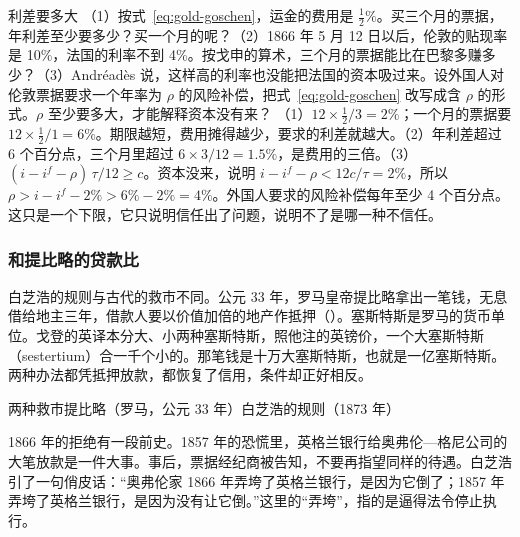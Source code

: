 \begin{example}{利差要多大}\label{ex:gold-goschen}
（1）按式~\eqref{eq:gold-goschen}，运金的费用是 $\tfrac12\%$。买三个月的票据，年利差至少要多少？买一个月的呢？（2）1866 年 5 月 12 日以后，伦敦的贴现率是 10\%，法国的利率不到 4\%\cite{boe2017,andreades1909}。按戈申的算术，三个月的票据能比在巴黎多赚多少？（3）Andréadès 说，这样高的利率也没能把法国的资本吸过来\cite{andreades1909}。设外国人对伦敦票据要求一个年率为 $\rho$ 的风险补偿，把式~\eqref{eq:gold-goschen} 改写成含 $\rho$ 的形式。$\rho$ 至少要多大，才能解释资本没有来？
\solution （1）$12\times\tfrac12/3=2\%$；一个月的票据要 $12\times\tfrac12/1=6\%$。期限越短，费用摊得越少，要求的利差就越大。（2）年利差超过 6 个百分点，三个月里超过 $6\times3/12=1.5\%$，是费用的三倍。（3）$(i-i^{f}-\rho)\,\tau/12\ge c$。资本没来，说明 $i-i^{f}-\rho<12c/\tau=2\%$，所以 $\rho>i-i^{f}-2\%>6\%-2\%=4\%$。外国人要求的风险补偿每年至少 4 个百分点。这只是一个下限，它只说明信任出了问题，说明不了是哪一种不信任。
\end{example}

\subsubsection{和提比略的贷款比}
白芝浩的规则与古代的救市不同。公元 33 年，罗马皇帝提比略拿出一笔钱，无息借给地主三年，借款人要以价值加倍的地产作抵押（）\cite{tacitus,temin2001}。塞斯特斯是罗马的货币单位。戈登的英译本分大、小两种塞斯特斯，照他注的英镑价，一个大塞斯特斯（sestertium）合一千个小的\cite{tacitus}。那笔钱是十万大塞斯特斯，也就是一亿塞斯特斯\cite{tacitus}。两种办法都凭抵押放款，都恢复了信用，条件却正好相反。

\begin{compare}{两种救市}{提比略（罗马，公元 33 年）}{白芝浩的规则（1873 年）}
\end{compare}

1866 年的拒绝有一段前史。1857 年的恐慌里，英格兰银行给奥弗伦—格尼公司的大笔放款是一件大事\cite{bagehot1873}。事后，票据经纪商被告知，不要再指望同样的待遇\cite{bagehot1873}。白芝浩引了一句俏皮话：“奥弗伦家 1866 年弄垮了英格兰银行，是因为它倒了；1857 年弄垮了英格兰银行，是因为没有让它倒。”\cite{bagehot1873}这里的“弄垮”，指的是逼得法令停止执行。

